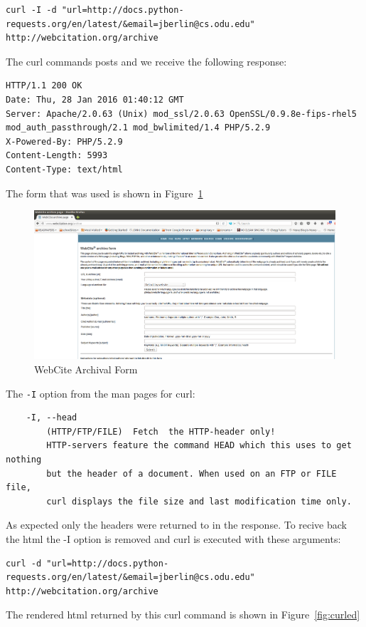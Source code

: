 \documentclass[letterpaper,10pt]{article}
\begin{document}
\begin{lstlisting}[frame=single]
curl -I -d "url=http://docs.python-requests.org/en/latest/&email=jberlin@cs.odu.edu"  http://webcitation.org/archive
\end{lstlisting}
The curl commands posts and we receive the following response:

\begin{lstlisting}[frame=single]
HTTP/1.1 200 OK
Date: Thu, 28 Jan 2016 01:40:12 GMT
Server: Apache/2.0.63 (Unix) mod_ssl/2.0.63 OpenSSL/0.9.8e-fips-rhel5 mod_auth_passthrough/2.1 mod_bwlimited/1.4 PHP/5.2.9
X-Powered-By: PHP/5.2.9
Content-Length: 5993
Content-Type: text/html
\end{lstlisting}
The form that was used is shown in Figure~\ref{fig:webciteForm}
\begin{figure}
\centering
\includegraphics[scale=0.35]{images/webciteForm.png}
\caption{WebCite Archival Form}
\label{fig:webciteForm}
\end{figure}
\newpage
The \verb+-I+ option from the man pages for curl:
\begin{verbatim}
    -I, --head
        (HTTP/FTP/FILE)  Fetch  the HTTP-header only! 
        HTTP-servers feature the command HEAD which this uses to get nothing 
        but the header of a document. When used on an FTP or FILE file, 
        curl displays the file size and last modification time only.
\end{verbatim}
As expected only the headers were returned to in the response. To recive back the html the -I option is removed and curl is executed with these arguments:
\begin{lstlisting}[frame=single]
curl -d "url=http://docs.python-requests.org/en/latest/&email=jberlin@cs.odu.edu"  http://webcitation.org/archive
\end{lstlisting}
\noindent
The rendered html returned by this curl command is shown in Figure~\ref{fig:curled}
\end{document}
